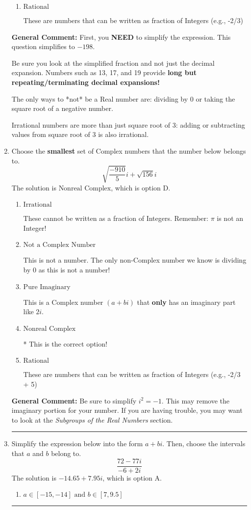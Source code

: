 \documentclass{extbook}[14pt]
\newcommand{\litem}[1]{\item #1

\rule{\textwidth}{0.4pt}}
\begin{document}
\begin{enumerate}
{\begin{enumerate}[label=\Alph*.]
These cannot be written as a fraction of Integers.
\item \( \text{Rational} \)

These are numbers that can be written as fraction of Integers (e.g., -2/3)
\end{enumerate}

\textbf{General Comment:} First, you \textbf{NEED} to simplify the expression. This question simplifies to $-198$. 
 
 Be sure you look at the simplified fraction and not just the decimal expansion. Numbers such as 13, 17, and 19 provide \textbf{long but repeating/terminating decimal expansions!} 
 
 The only ways to *not* be a Real number are: dividing by 0 or taking the square root of a negative number. 
 
 Irrational numbers are more than just square root of 3: adding or subtracting values from square root of 3 is also irrational.
}
\litem{
Choose the \textbf{smallest} set of Complex numbers that the number below belongs to.
\[ \sqrt{\frac{-910}{5}} i+\sqrt{156}i \]The solution is \( \text{Nonreal Complex} \), which is option D.\begin{enumerate}[label=\Alph*.]
\item \( \text{Irrational} \)

These cannot be written as a fraction of Integers. Remember: $\pi$ is not an Integer!
\item \( \text{Not a Complex Number} \)

This is not a number. The only non-Complex number we know is dividing by 0 as this is not a number!
\item \( \text{Pure Imaginary} \)

This is a Complex number $(a+bi)$ that \textbf{only} has an imaginary part like $2i$.
\item \( \text{Nonreal Complex} \)

* This is the correct option!
\item \( \text{Rational} \)

These are numbers that can be written as fraction of Integers (e.g., -2/3 + 5)
\end{enumerate}

\textbf{General Comment:} Be sure to simplify $i^2 = -1$. This may remove the imaginary portion for your number. If you are having trouble, you may want to look at the \textit{Subgroups of the Real Numbers} section.
}
\litem{
Simplify the expression below into the form $a+bi$. Then, choose the intervals that $a$ and $b$ belong to.
\[ \frac{72 - 77 i}{-6 + 2 i} \]The solution is \( -14.65  + 7.95 i \), which is option A.\begin{enumerate}[label=\Alph*.]
\item \( a \in [-15, -14] \text{ and } b \in [7, 9.5] \)


\end{enumerate}}
\end{enumerate}
\end{document}
